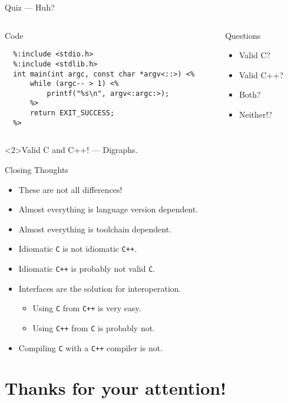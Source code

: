 \documentclass[presentation,aspectratio=169]{beamer}
\begin{document}
\begin{frame}[fragile,label={sec:org23c4234}]{Quiz — Huh?}
 \begin{columns}
\begin{column}{0.68\columnwidth}
\begin{block}{Code}
\begin{verbatim}
  %:include <stdio.h>
  %:include <stdlib.h>
  int main(int argc, const char *argv<::>) <%
      while (argc-- > 1) <%
          printf("%s\n", argv<:argc:>);
      %>
      return EXIT_SUCCESS;
  %>
\end{verbatim}
\end{block}
\end{column}

\begin{column}{0.38\columnwidth}
\begin{block}{Questions}
\begin{itemize}
\item Valid C?
\item Valid C++?
\item Both?
\item Neither!?
\end{itemize}
\end{block}
\end{column}
\end{columns}

\begin{block}<2>{Valid C and C++! — Digraphs.}
\end{block}
\end{frame}


\begin{frame}[fragile,label={sec:org23c6824}]{Closing Thoughts}
  \begin{itemize}
  \item These are not all differences!
  \item Almost everything is language version dependent.
  \item Almost everything is toolchain dependent.
  \item Idiomatic \texttt{C} is not idiomatic \texttt{C++}.
  \item Idiomatic \texttt{C++} is probably not valid \texttt{C}.
  \item Interfaces are the solution for interoperation.
    \begin{itemize}
    \item Using \texttt{C} from \texttt{C++} is very easy.
    \item Using \texttt{C++} from \texttt{C} is probably not.
    \end{itemize}
  \item Compiling \texttt{C} with a \texttt{C++} compiler is not.
  \end{itemize}
\end{frame}



\section{Thanks for your attention!}
\label{sec:org6df872a}
\end{document}
